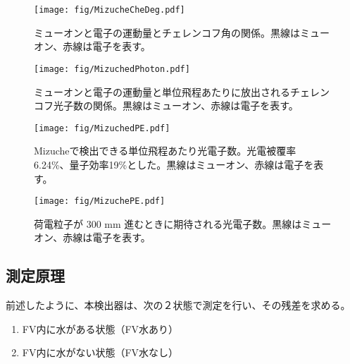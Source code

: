 \documentclass[11pt]{ltjsreport}
\begin{document}
\begin{figure}[htbp]
\begin{minipage}{0.47\textwidth}
\centering
\texttt{[image: fig/MizucheCheDeg.pdf]}
\caption[ミューオンと電子の運動量とチェレンコフ角の関係]{ミューオンと電子の運動量とチェレンコフ角の関係。黒線はミューオン、赤線は電子を表す。}
\label{MizucheCheDeg}
\end{minipage}
\hfil
\begin{minipage}{0.47\textwidth}
\centering
\texttt{[image: fig/MizuchedPhoton.pdf]}
\caption[ミューオンと電子の運動量と単位飛程あたりに放出されるチェレンコフ光子数の関係]{ミューオンと電子の運動量と単位飛程あたりに放出されるチェレンコフ光子数の関係。黒線はミューオン、赤線は電子を表す。}
\label{MizuchedPhoton}
\end{minipage}
\end{figure}


\begin{figure}[htbp]
\begin{minipage}{0.47\textwidth}
\centering
\texttt{[image: fig/MizuchedPE.pdf]}
\caption[Mizucheで検出できる単位飛程あたりの光電子数]{Mizucheで検出できる単位飛程あたり光電子数。光電被覆率 6.24\%、量子効率19\%とした。黒線はミューオン、赤線は電子を表す。}
\label{MizuchedPE}
\end{minipage}
\hfil
\begin{minipage}{0.47\textwidth}
\centering
\texttt{[image: fig/MizuchePE.pdf]}
\caption[荷電粒子が 300 mm 進むときに期待される光電子数数]{荷電粒子が 300 mm 進むときに期待される光電子数。黒線はミューオン、赤線は電子を表す。}
\label{MizuchePE}
\end{minipage}
\end{figure}

\newpage
\subsection{測定原理}
前述したように、本検出器は、次の２状態で測定を行い、その残差を求める。
\begin{enumerate}
\item FV内に水がある状態（FV水あり）
\item FV内に水がない状態（FV水なし）
\end{enumerate}
\end{document}
